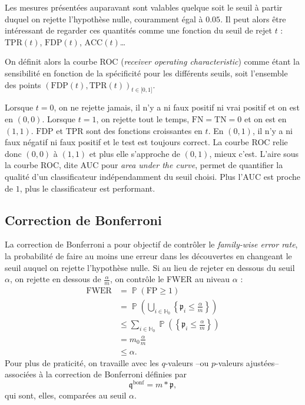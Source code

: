 \documentclass[12pt,a4paper]{reedthesis}
\DeclareMathOperator*{\prob}{\mathbb{P}}
\newcommand \PP [1]{\prob\left({#1}\right)}
\newcommand \pv {\mathfrak{p}}
\newcommand \qv {\mathfrak{q}}
\theoremstyle{definition}
\theoremstyle{definition}
\theoremstyle{definition}
\theoremstyle{remark}
\begin{document}
Les mesures présentées auparavant sont valables quelque soit le seuil à partir duquel on rejette l'hypothèse nulle, couramment égal à \(0.05\). Il peut alors être intéressant de regarder ces quantités comme une fonction du seuil de rejet \(t\) : \(\text{TPR}(t)\), \(\text{FDP}(t)\), \(\text{ACC}(t)\)\ldots{}

On définit alors la courbe ROC (\emph{receiver operating characteristic}) comme étant la sensibilité en fonction de la spécificité pour les différents seuils, soit l'ensemble des points \(\left(\text{FDP}(t), \text{TPR}(t)\right)_{t\in\mathopen[0,1\mathclose]}\).

Lorsque \(t=0\), on ne rejette jamais, il n'y a ni faux positif ni vrai positif et on est en \((0,0)\). Lorsque \(t=1\), on rejette tout le temps, \(\text{FN} = \text{TN} = 0\) et on est en \((1,1)\). \(\text{FDP}\) et \(\text{TPR}\) sont des fonctions croissantes en \(t\). En \((0,1)\), il n'y a ni faux négatif ni faux positif et le test est toujours correct. La courbe ROC relie donc \((0,0)\) à \((1,1)\) et plus elle s'approche de \((0,1)\), mieux c'est. L'aire sous la courbe ROC, dite AUC pour \emph{area under the curve}, permet de quantifier la qualité d'un classificateur indépendamment du seuil choisi. Plus l'AUC est proche de \(1\), plus le classificateur est performant.

\hypertarget{correction-de-bonferroni}{%
\subsection{Correction de Bonferroni}\label{correction-de-bonferroni}}

La correction de Bonferroni a pour objectif de contrôler le \emph{family-wise error rate}, la probabilité de faire au moins une erreur dans les découvertes en changeant le seuil auquel on rejette l'hypothèse nulle. Si au lieu de rejeter en dessous du seuil \(\alpha\), on rejette en dessous de \(\frac{\alpha}{m}\), on contrôle le FWER au niveau \(\alpha\) :
\begin{align*}
\text{FWER} & = \PP{\text{FP} \geq 1} \\
& = \PP{\bigcup_{i\in \mathbb{H}_0} \left\{\pv_i \leq \frac{\alpha}{m}\right\} } \\
& \leq \sum_{i\in \mathbb{H}_0} \PP{\left\{\pv_i \leq \frac{\alpha}{m} \right\}} \\
& = m_0 \frac{\alpha}{m}  \\
& \leq \alpha.
\end{align*}
Pour plus de praticité, on travaille avec les \(q\)-valeurs --ou \(p\)-valeurs ajustées-- associées à la correction de Bonferroni définies par
\begin{equation*}
\qv^{\text{bonf}} = m * \pv,
\end{equation*}
qui sont, elles, comparées au seuil \(\alpha\).
\end{document}
